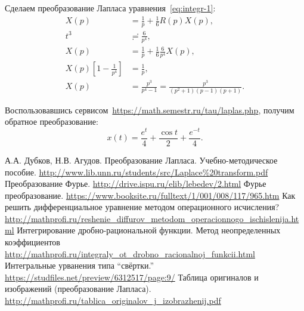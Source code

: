 \documentclass[12pt]{report}
\begin{document}
Сделаем преобразование Лапласа уравнения~\eqref{eq:integr-1}:
\begin{align*}
X(p) &= \frac1p + \frac16 R(p)X(p), \\
t^3 &\risingdotseq \frac{6}{p^4}, \\
X(p) &= \frac1p + \frac16\frac{6}{p^4}X(p), \\
X(p)\left[1 - \frac{1}{p^4}\right] &= \frac1p, \\
X(p) &= \frac{p^3}{p^4-1} = \frac{p^3}{(p^2+1)(p-1)(p+1)}.
\end{align*}

Воспользовавшись сервисом~\url{https://math.semestr.ru/tau/laplas.php}, получим обратное преобразование:
\[
x(t) = \frac{e^t}{4} + \frac{\cos t}{2} + \frac{e^{-t}}{4}.
\]


\begin{thebibliography}{0}
	А.А. Дубков, Н.В. Агудов. Преобразование Лапласа. Учебно-методическое пособие.
	\url{http://www.lib.unn.ru/students/src/Laplace%20transform.pdf}
	Преобразование Фурье.
	\url{http://drive.ispu.ru/elib/lebedev/2.html}
	Фурье преобразование.
	\url{https://www.booksite.ru/fulltext/1/001/008/117/965.htm}
	Как решить дифференциальное уравнение
	методом операционного исчисления?
	\url{http://mathprofi.ru/reshenie_diffurov_metodom_operacionnogo_ischislenija.html}
	Интегрирование дробно-рациональной функции. 
	Метод неопределенных коэффициентов
	\url{http://mathprofi.ru/integraly_ot_drobno_racionalnoj_funkcii.html}
	Интегральные урванения типа ``свёртки.''
	\url{https://studfiles.net/preview/6312517/page:9/}
	Таблица оригиналов и изображений (преобразование Лапласа).
	\url{http://mathprofi.ru/tablica_originalov_j_izobrazhenij.pdf}
\end{thebibliography}
\end{document}
